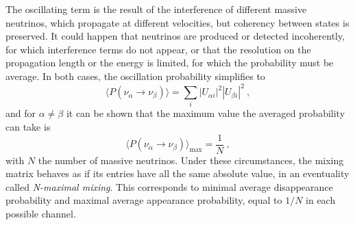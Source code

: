 The oscillating term is the result of the interference of different massive neutrinos, %
which propagate at different velocities, but coherency between states is preserved.
It could happen that neutrinos are produced or detected incoherently, for which interference terms %
do not appear, or that the resolution on the propagation length or the energy is limited, %
for which the probability must be average.
In both cases, the oscillation probability simplifies to
\begin{equation}
	\label{eq:average_oscillation}
	\langle P(\nu_\alpha \to \nu_\beta)\rangle = \sum_{i} |U_{\alpha i}|^2 |U_{\beta i}|^2\ ,
\end{equation}
and for $\alpha \neq \beta$ it can be shown that the maximum value the averaged probability %
can take is 
\begin{equation}
	\langle P(\nu_\alpha \to \nu_\beta)\rangle_\text{max} = \frac{1}{N}\ ,
\end{equation}
with $N$ the number of massive neutrinos.
Under these circumstances, the mixing matrix behaves as if its entries have all the same absolute value, %
in an eventuality called \emph{N-maximal mixing}.
This corresponds to minimal average disappearance probability and maximal %
average appearance probability, equal to $1/N$ in each possible channel.

